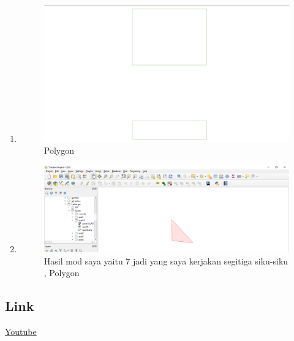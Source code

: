 \begin{enumerate}
	\item 
	
	\begin{figure}[H]
		\includegraphics[width=12cm]{figures/1174039/gambar/hasil9.PNG}
		\centering
		\caption{Polygon}
	\end{figure}
	
	\item 
	
	\begin{figure}[H]
		\includegraphics[width=12cm]{figures/1174039/gambar/hasil10.PNG}
		\centering
		\caption{Hasil mod saya yaitu 7 jadi yang saya kerjakan segitiga siku-siku , Polygon}
	\end{figure}	
\end{enumerate}

\subsection{Link}
\href{https://youtu.be/tM_PguRyR4A}{Youtube}